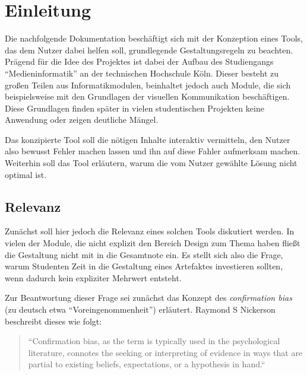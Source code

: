 
\chapter{Einleitung} %

\label{Einleitung} %



Die nachfolgende Dokumentation beschäftigt sich mit der Konzeption eines Tools, das dem Nutzer dabei helfen soll, grundlegende Gestaltungsregeln zu beachten.
Prägend für die Idee des Projektes ist dabei der Aufbau des Studiengangs “Medieninformatik” an der technischen Hochschule Köln. Dieser besteht zu großen Teilen aus Informatikmodulen, beinhaltet jedoch auch Module, die sich beispielsweise mit den Grundlagen der visuellen Kommunikation beschäftigen. Diese Grundlagen finden später in vielen studentischen Projekten keine Anwendung oder zeigen deutliche Mängel.

Das konzipierte Tool soll die nötigen Inhalte interaktiv vermitteln, den Nutzer also bewusst Fehler machen lassen und ihn auf diese Fahler aufmerksam machen. Weiterhin soll das Tool erläutern, warum die vom Nutzer gewählte Lösung nicht optimal ist.



\section{Relevanz}
Zunächst soll hier jedoch die Relevanz eines solchen Tools diskutiert werden. In vielen der Module, die nicht explizit den Bereich Design zum Thema haben fließt die Gestaltung nicht mit in die Gesamtnote ein. Es stellt sich also die Frage, warum Studenten Zeit in die Gestaltung eines Artefaktes investieren sollten, wenn dadurch kein expliziter Mehrwert entsteht.

Zur Beantwortung dieser Frage sei zunächst das Konzept des \textit{confirmation bias} (zu deutsch etwa “Voreingenommenheit”) erläutert. Raymond S Nickerson beschreibt dieses wie folgt:

\begin{quote}
“Confirmation bias, as the term is typically used in the psychological literature, connotes the seeking or interpreting of evidence in ways that are partial to existing beliefs, expectations, or a hypothesis in hand.“ \cite{nickerson1998confirmation}
\end{quote}

